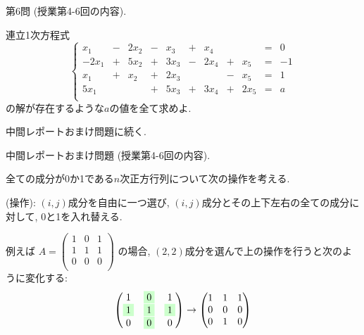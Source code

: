 \documentclass[dvipdfmx,a4paper,11pt]{article}
\theoremstyle{definition}
\begin{document}
\vspace{33pt} 

{\Large 第6問} (授業第4-6回の内容).
    \vspace{11pt}

連立1次方程式
 $$
 \left\{ 
\begin{array}{ccccccccccc}
x_1&-&2x_2&  -&x_3	&+&x_4& &	&=& 0\\
-2x_1&+&5x_2& + &3x_3&-&2x_4&+&x_5&= &-1 \\
x_1&+&x_2& + &2x_3& &    &-&x_5&= &1\\
5x_1& & & + &5x_3& +&3x_4   &+&2x_5&= &a\\
\end{array}
\right.
 $$
の解が存在するような$a$の値を全て求めよ.
 
\vspace{33pt} 

  \begin{flushright}
 {\LARGE 中間レポートおまけ問題に続く.}
 \end{flushright}
 \newpage
 
{\Large 中間レポートおまけ問題} (授業第4-6回の内容).
\vspace{11pt}

全ての成分が0か1である$n$次正方行列について次の操作を考える.

\vspace{5pt}
 \begin{tcolorbox}[
    colback = white,
    colframe = black,
    fonttitle = \bfseries,
    breakable = true]
(操作): $(i,j)$成分を自由に一つ選び, $(i,j)$成分とその上下左右の全ての成分に対して, 0と1を入れ替える.
 \end{tcolorbox}
\vspace{5pt}

例えば
$
A =
 \begin{pmatrix}
1 & 0 & 1\\
1 & 1 & 1\\
0 & 0 & 0 \\
 \end{pmatrix}
 $
 の場合, $(2,2)$成分を選んで上の操作を行うと次のように変化する:
 $$
  \begin{pmatrix}
1 & \colorbox[rgb]{0.8, 1.0, 0.8}{0} & 1\\
\colorbox[rgb]{0.8, 1.0, 0.8}{1} & \colorbox[rgb]{0.8, 1.0, 0.8}{1} & \colorbox[rgb]{0.8, 1.0, 0.8}{1}\\
0 & \colorbox[rgb]{0.8, 1.0, 0.8}{0} & 0 \\
 \end{pmatrix}
 \rightarrow 
  \begin{pmatrix}
1 & 1 & 1\\
0 & 0 & 0\\
0 & 1 & 0 \\
 \end{pmatrix}
 $$
 
\end{document}
